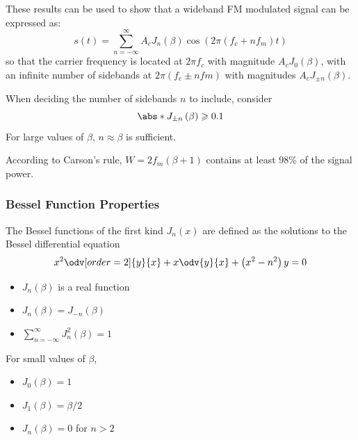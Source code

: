 \documentclass{article}
\begin{document}
These results can be used to show that a wideband FM modulated signal can be expressed as:
\begin{equation*}
    s\left( t \right) = \sum_{n = -\infty}^\infty A_c J_n\left( \beta \right) \cos{\left( 2 \pi \left( f_c + n f_m \right) t \right)}
\end{equation*}
so that the carrier frequency is located at \(2 \pi f_c\) with magnitude \(A_c J_0\left( \beta \right)\), with an
infinite number of sidebands at \(2 \pi \left( f_c \pm n fm \right)\) with magnitudes \(A_c J_{\pm n}\left( \beta \right)\).

When deciding the number of sidebands \(n\) to include, consider
\begin{equation*}
    \abs*{J_{\pm n}\left( \beta \right)} \geqslant 0.1
\end{equation*}
For large values of \(\beta\), \(n \approx \beta\) is sufficient.

According to Carson's rule, \(W = 2 f_m \left( \beta + 1 \right)\) contains at least \(98\%\) of the signal power.
\subsubsection{Bessel Function Properties}
The Bessel functions of the first kind \(J_n\left( x \right)\) are defined as the solutions to the Bessel differential equation
\begin{equation*}
    x^2 \odv[order=2]{y}{x} + x \odv{y}{x} + \left( x^2 - n^2 \right) y = 0
\end{equation*}
\begin{itemize}
    \item \(J_n\left( \beta \right)\) is a real function
    \item \(J_n\left( \beta \right) = J_{-n}\left( \beta \right)\)
    \item \(\sum_{n = -\infty}^\infty J_n^2\left( \beta \right) = 1\)
\end{itemize}
For small values of \(\beta\),
\begin{itemize}
    \item \(J_0\left( \beta \right) = 1\)
    \item \(J_1\left( \beta \right) = \beta/2\)
    \item \(J_n\left( \beta \right) = 0\) for \(n > 2\)
\end{itemize}
\end{document}
